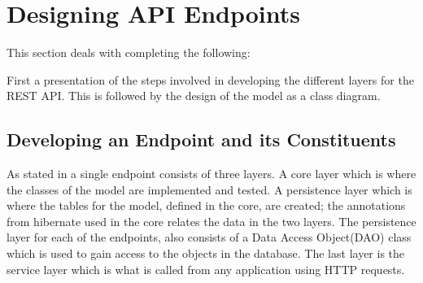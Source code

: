 \section{Designing API Endpoints}\label{sec:generalEP}
This section deals with completing the following:
\begin{center}
\medskip
{}
\end{center}

\noindent
First a presentation of the steps involved in developing the different layers for the REST API.
This is followed by the design of the model as a class diagram.

\subsection{Developing an Endpoint and its Constituents}\label{subsec:general}
As stated in  a single endpoint consists of three layers.
A core layer which is where the classes of the model are implemented and tested.
A persistence layer which is where the tables for the model, defined in the core, are created; the annotations from hibernate used in the core relates the data in the two layers.
The persistence layer for each of the endpoints, also consists of a Data Access Object(DAO) class which is used to gain access to the objects in the database.
The last layer is the service layer which is what is called from any application using HTTP requests.

